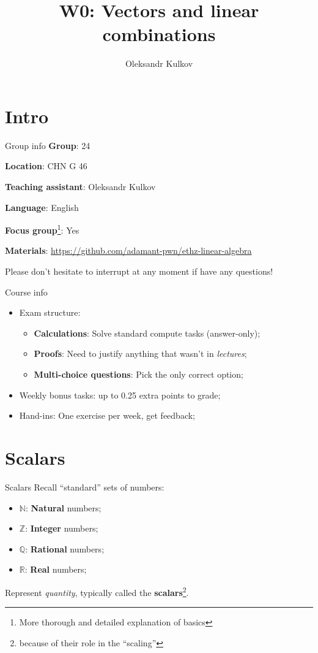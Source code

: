 \documentclass[10pt]{beamer}
\title{W0: Vectors and linear combinations}
\date{}
\author{Oleksandr Kulkov}
\institute{ETH Zürich}
\begin{document}
\maketitle

\section{Intro}
\begin{frame}{Group info}
    \textbf{Group}: 24

    \textbf{Location}: CHN G 46
    
    \textbf{Teaching assistant}: Oleksandr Kulkov

    \textbf{Language}: English

    \textbf{Focus group}\footnote{More thorough and detailed explanation of basics}: Yes

    \textbf{Materials}: \small\url{https://github.com/adamant-pwn/ethz-linear-algebra}

    Please don't hesitate to interrupt at any moment if have any questions!
\end{frame}

\begin{frame}{Course info}
\begin{itemize}
    \item Exam structure:
    \begin{itemize}
        \item \textbf{Calculations}: Solve standard compute tasks (answer-only);
        \item \textbf{Proofs}: Need to justify anything that wasn't in \textit{lectures};
        \item \textbf{Multi-choice questions}: Pick the only correct option;
    \end{itemize}
    \item Weekly bonus tasks: up to 0.25 extra points to grade;
    \item Hand-ins: One exercise per week, get feedback;
\end{itemize}
\end{frame}

\section{Scalars}
\begin{frame}{Scalars}
    Recall ``standard'' sets of numbers:

    \begin{itemize}
        \item $\mathbb N$: \textbf{Natural} numbers;
        \item $\mathbb Z$: \textbf{Integer} numbers;
        \item $\mathbb Q$: \textbf{Rational} numbers;
        \item $\mathbb R$: \textbf{Real} numbers;
    \end{itemize}

    Represent \textit{quantity}, typically called the \textbf{scalars}\footnote{because of their role in the ``scaling''}.
\end{frame}
\end{document}
